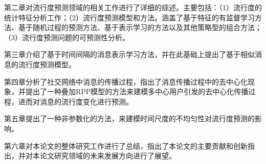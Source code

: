 第二章对流行度预测领域的相关工作进行了详细的综述。主要包括：（1）流行度的统计特征分析工作；（2）流行度预测模型和方法。涵盖了基于特征的有监督学习方法、基于随机过程的预测方法、基于表示学习的方法以及其他策略型的组合方法；（3）流行度预测问题的可预测性分析。

第三章介绍了基于时间间隔的消息表示学习方法，并在此基础上提出了基于相似消息的流行度预测模型。

第四章分析了社交网络中消息的传播过程，指出了消息传播过程中的去中心化现象，并提出了一种叠加RPP模型的方法来建模多中心用户引发的去中心化传播过程，进而对消息的流行度变化进行预测。

第五章提出了一种非参数化的方法，来建模时间尺度的不均匀性对流行度预测的影响。

第六章对本论文的整体研究工作进行了总结，指出了本论文的主要贡献和创新指出，并对本论文研究领域的未来发展方向进行了展望。
